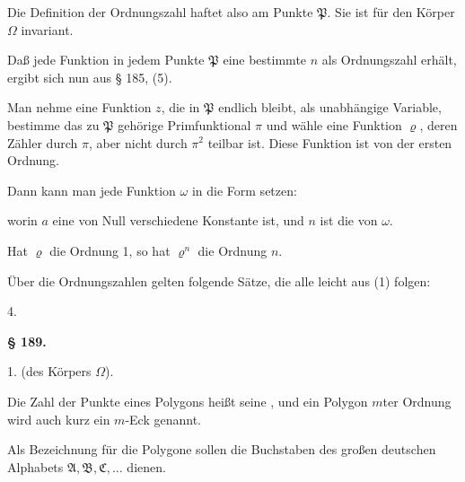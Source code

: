 Die Definition der Ordnungszahl haftet also am Punkte $\mathfrak{P}$. Sie ist für den Körper $\Omega$ invariant.

Daß jede Funktion in jedem Punkte $\mathfrak{P}$ eine bestimmte  $n$ als Ordnungszahl erhält, ergibt sich nun aus § 185, (5).

Man nehme eine Funktion $z$, die in $\mathfrak{P}$ endlich bleibt, als unabhängige Variable, bestimme das zu $\mathfrak{P}$ gehörige Primfunktional $\pi$ und wähle eine Funktion $\varrho$, deren Zähler durch $\pi$, aber nicht durch $\pi^2$ teilbar ist. Diese Funktion ist von der ersten Ordnung.

Dann kann man jede Funktion $\omega$ in die Form setzen:

worin $a$ eine von Null verschiedene Konstante ist, und $n$ ist die  von $\omega$.

Hat $\varrho$ die Ordnung 1, so hat $\varrho^n$ die Ordnung $n$.

Über die Ordnungszahlen gelten folgende Sätze, die alle leicht aus (1) folgen:

4. 



\begin{center}
\textbf{§ 189. }
\end{center}

1.  (des Körpers $\Omega$).

Die Zahl der Punkte eines Polygons heißt seine , und ein Polygon $m$ter Ordnung wird auch kurz ein $m$-Eck genannt.

Als Bezeichnung für die Polygone sollen die Buchstaben des großen deutschen Alphabets $\mathfrak{A}, \mathfrak{B}, \mathfrak{C}, \ldots$ dienen.
